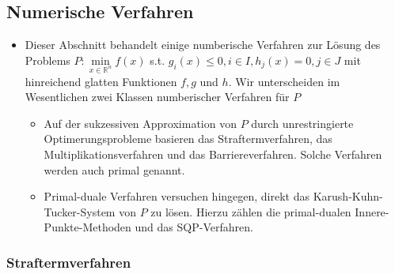 \documentclass[paper=a4, fontsize=11pt]{scrartcl} %
\numberwithin{equation}{section} %
\numberwithin{figure}{section} %
\numberwithin{table}{section} %
\begin{document}
\subsection{Numerische Verfahren}

\begin{itemize}
  \item Dieser Abschnitt behandelt einige numberische Verfahren zur Lösung des Problems $P: \min\limits_{x \in \mathbb{R}^n} f(x)$ s.t. $g_i(x) \le 0, i \in I, h_j(x) = 0, j \in J$ mit hinreichend glatten Funktionen $f, g$ und $h$. Wir unterscheiden im Wesentlichen zwei Klassen numberischer Verfahren für $P$
  \begin{itemize}
    \item Auf der sukzessiven Approximation von $P$ durch unrestringierte Optimerungsprobleme basieren das Straftermverfahren, das Multiplikationsverfahren und das Barriereverfahren. Solche Verfahren werden auch primal genannt.
    \item Primal-duale Verfahren versuchen hingegen, direkt das Karush-Kuhn-Tucker-System von $P$ zu lösen. Hierzu zählen die primal-dualen Innere-Punkte-Methoden und das SQP-Verfahren.
  \end{itemize}
\end{itemize}

\subsubsection{Straftermverfahren}
\end{document}
